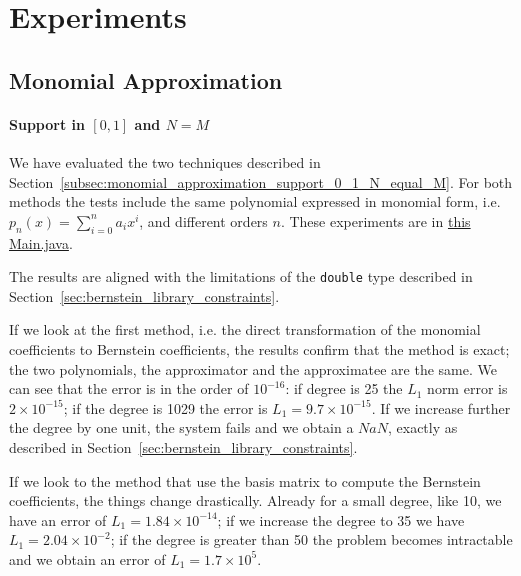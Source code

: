 \chapter{Experiments}

\section{Monomial Approximation}

\subsubsection{Support in $[0,1]$ and $N=M$}
We have evaluated the two techniques described in Section~\ref{subsec:monomial_approximation_support_0_1_N_equal_M}. For both methods the tests include the same polynomial expressed in monomial form, i.e. $\displaystyle p_n(x)=\sum_{i=0}^{n} a_i x^i$, and different orders $n$. These experiments are in \href{https://github.com/edoardosarri24/probabilistic-soft-real-time-analysis/blob/main/bernstein/src/main/java/Main_monomial_approximation_support_0_1_N_equal_M.java}{this Main.java}.

The results are aligned with the limitations of the \texttt{double} type described in Section~\ref{sec:bernstein_library_constraints}.

\myskip

If we look at the first method, i.e. the direct transformation of the monomial coefficients to Bernstein coefficients, the results confirm that the method is exact; the two polynomials, the approximator and the approximatee are the same. We can see that the error is in the order of $10^{-16}$: if degree is 25 the $L_1$ norm error is $2\times10^{-15}$; if the degree is 1029 the error is $L_1=9.7\times10^{-15}$. If we increase further the degree by one unit, the system fails and we obtain a $NaN$, exactly as described in Section~\ref{sec:bernstein_library_constraints}.

\myskip

If we look to the method that use the basis matrix to compute the Bernstein coefficients, the things change drastically. Already for a small degree, like 10, we have an error of $L_1=1.84 \times 10^{-14}$; if we increase the degree to 35 we have $L_1=2.04\times 10^{-2}$; if the degree is greater than 50 the problem becomes intractable and we obtain an error of $L_1=1.7\times10^{5}$.